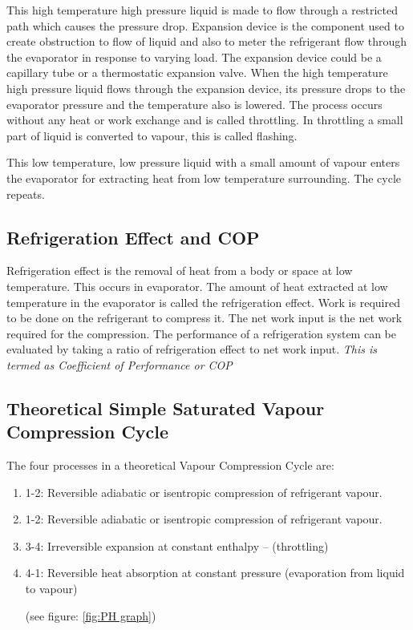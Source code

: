 \documentclass[11pt]{article}
\begin{document}
This high temperature high pressure liquid is made to flow through a restricted path which causes the pressure drop. Expansion device is the component used to create obstruction to flow of liquid and also to meter the refrigerant flow through the evaporator in response to varying load. The expansion device could be a capillary tube or a thermostatic expansion valve. When the high temperature high pressure liquid flows through the expansion device, its pressure drops to the evaporator pressure and the temperature also is lowered. The process occurs without any heat or work exchange and is called throttling. In throttling a small part of liquid is converted to vapour, this is called flashing.


This low temperature, low pressure liquid with a small amount of vapour enters the evaporator for extracting heat from low temperature surrounding. The cycle repeats.
\pagebreak

\subsection{Refrigeration Effect and COP}

Refrigeration effect is the removal of heat from a body or space at low temperature. This occurs in evaporator. The amount of heat extracted at low temperature in the evaporator is called the refrigeration effect. Work is required to be done on the refrigerant to compress it. The net work input is the net work required for the compression. The performance of a refrigeration system can be evaluated by taking a
ratio of refrigeration effect to net work input. \textit{This is termed as Coefficient of Performance or COP}


\subsection{Theoretical Simple Saturated Vapour Compression Cycle}

The four processes in a theoretical Vapour Compression Cycle are:

\begin{enumerate}
	\item 1-2: Reversible adiabatic or isentropic compression of refrigerant vapour.
	\item 1-2: Reversible adiabatic or isentropic compression of refrigerant vapour.
	\item 3-4: Irreversible expansion at constant enthalpy – (throttling)
	\item 4-1: Reversible heat absorption at constant pressure (evaporation from liquid to vapour)
	
	(see figure: \ref{fig:PH graph})
\end{enumerate}
\end{document}
